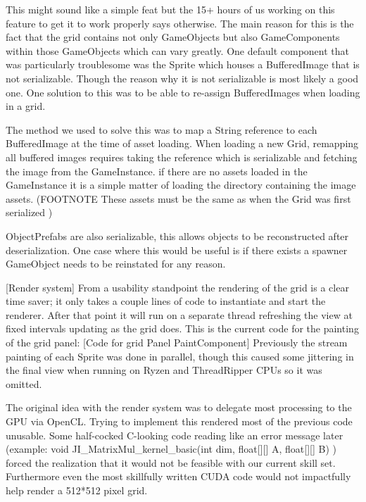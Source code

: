 \documentclass{article}
\begin{document}
This might sound like a simple feat but the 15+ hours of us working on this feature to get it to work properly says otherwise. The main reason for this is the fact that the grid contains not only GameObjects but also GameComponents within those GameObjects which can vary greatly. One default component that was particularly troublesome was the Sprite which houses a BufferedImage that is not serializable. Though the reason why it is not serializable is most likely a good one. One solution to this was to be able to re-assign BufferedImages when loading in a grid. 

The method we used to solve this was to map a String reference to each BufferedImage at the time of asset loading. When loading a new Grid, remapping all buffered images requires taking the reference which is serializable and fetching the image from the GameInstance. if there are no assets loaded in the GameInstance it is a simple matter of loading the directory containing the image assets. (FOOTNOTE These assets must be the same as when the Grid was first serialized )

ObjectPrefabs are also serializable, this allows objects to be reconstructed after deserialization. One case where this would be useful is if there exists a spawner GameObject needs to be reinstated for any reason. 

[Render system]
From a usability standpoint the rendering of the grid is a clear time saver; it only takes a couple lines of code to instantiate and start the renderer. After that point it will run on a separate thread refreshing the view at fixed intervals updating as the grid does. This is the current code for the painting of the grid panel:
	[Code for grid Panel PaintComponent]
Previously the stream painting of each Sprite was done in parallel, though this caused some jittering in the final view when running on Ryzen and ThreadRipper CPUs so it was omitted.

The original idea with the render system was to delegate most processing to the GPU via OpenCL. Trying to implement this rendered most of the previous code unusable. Some half-cocked C-looking code reading like an error message later (example: void JI\_MatrixMul\_kernel\_basic(int dim, float[][] A, float[][] B){} )  forced the realization that it would not be feasible with our current skill set. Furthermore even the most skillfully written CUDA code would not impactfully help render a 512*512 pixel grid.
\end{document}
